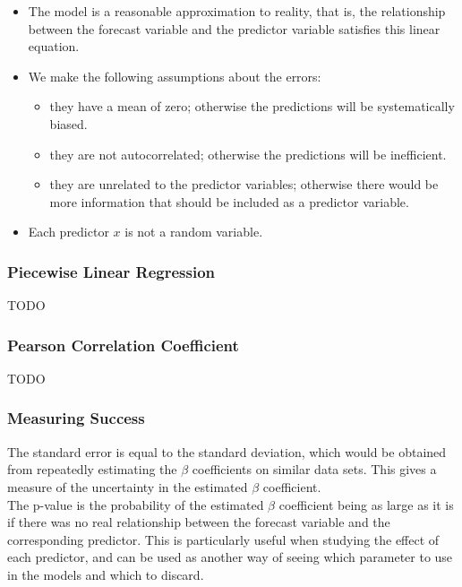 \begin{itemize}
    \item The model is a reasonable approximation to reality, that is, the relationship between the forecast variable and the predictor variable satisfies this linear equation.
    \item We make the following assumptions about the errors:
    \begin{itemize}
        \item they have a mean of zero; otherwise the predictions will be systematically biased.
        \item they are not autocorrelated; otherwise the predictions will be inefficient.
        \item they are unrelated to the predictor variables; otherwise there would be more information that should be included as a predictor variable.
    \end{itemize}
    \item Each predictor $x$ is not a random variable.
\end{itemize}

\subsubsection{Piecewise Linear Regression}

TODO

\subsubsection{Pearson Correlation Coefficient}

TODO

\subsubsection{Measuring Success}

The standard error is equal to the standard deviation, which would be obtained from repeatedly estimating the $\beta$ coefficients on similar data sets. This gives a measure of the uncertainty in the estimated $\beta$ coefficient. \\

The p-value is the probability of the estimated $\beta$ coefficient being as large as it is if there was no real relationship between the forecast variable and the corresponding predictor. This is particularly useful when studying the effect of each predictor, and can be used as another way of seeing which parameter to use in the models and which to discard. \\ 


